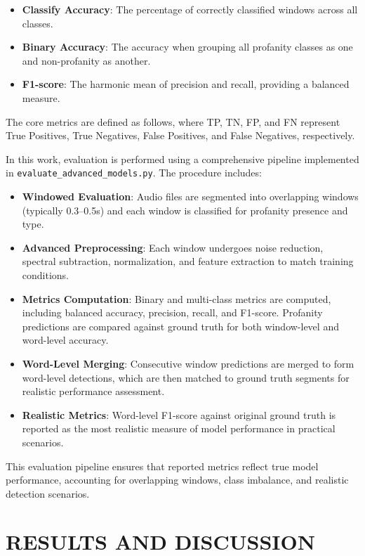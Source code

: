 \documentclass[11pt]{article}
\begin{document}
\begin{itemize}
    \item \textbf{Classify Accuracy}: The percentage of correctly classified windows across all classes.
    \item \textbf{Binary Accuracy}: The accuracy when grouping all profanity classes as one and non-profanity as another.
    \item \textbf{F1-score}: The harmonic mean of precision and recall, providing a balanced measure.
\end{itemize}

The core metrics are defined as follows, where TP, TN, FP, and FN represent True Positives, True Negatives, False Positives, and False Negatives, respectively.

In this work, evaluation is performed using a comprehensive pipeline implemented in \texttt{evaluate\_advanced\_models.py}. The procedure includes:
\begin{itemize}
    \item \textbf{Windowed Evaluation}: Audio files are segmented into overlapping windows (typically 0.3--0.5s) and each window is classified for profanity presence and type.
    \item \textbf{Advanced Preprocessing}: Each window undergoes noise reduction, spectral subtraction, normalization, and feature extraction to match training conditions.
    \item \textbf{Metrics Computation}: Binary and multi-class metrics are computed, including balanced accuracy, precision, recall, and F1-score. Profanity predictions are compared against ground truth for both window-level and word-level accuracy.
    \item \textbf{Word-Level Merging}: Consecutive window predictions are merged to form word-level detections, which are then matched to ground truth segments for realistic performance assessment.
    \item \textbf{Realistic Metrics}: Word-level F1-score against original ground truth is reported as the most realistic measure of model performance in practical scenarios.
\end{itemize}

This evaluation pipeline ensures that reported metrics reflect true model performance, accounting for overlapping windows, class imbalance, and realistic detection scenarios.

\section{RESULTS AND DISCUSSION}
\end{document}
